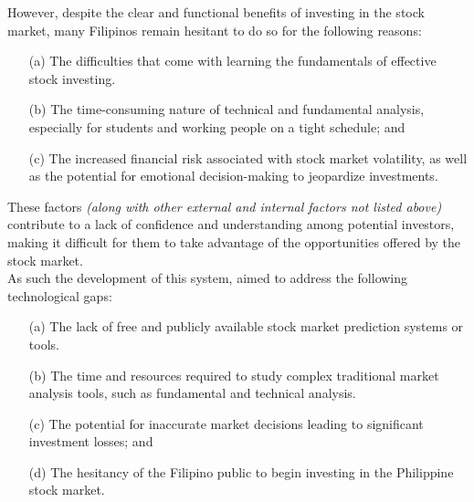 However, despite the clear and functional benefits of investing in the stock market, 
many Filipinos remain hesitant to do so for the following reasons:
\begin{itemize}
  \item[(a)] The difficulties that come with learning the fundamentals 
  of effective stock investing.
  \item[(b)] The time-consuming nature of technical and fundamental analysis, 
  especially for students and working people on a tight schedule; and
  \item[(c)] The increased financial risk associated with stock market volatility, 
  as well as the potential for emotional decision-making to jeopardize investments.
\end{itemize}

These factors \textit{(along with other external and internal factors not listed above)}
contribute to a lack of confidence and understanding among potential investors, 
making it difficult for them to take advantage of the opportunities offered 
by the stock market.
\hfill \\

As such the development of this system, aimed to address the following technological gaps:
\begin{itemize}
  \item[(a)] The lack of free and publicly available 
  stock market prediction systems or tools.
  \item[(b)] The time and resources required to study complex traditional 
  market analysis tools, such as fundamental and technical analysis.
  \item[(c)] The potential for inaccurate market decisions
  leading to significant investment losses; and
  \item[(d)] The hesitancy of the Filipino public to begin 
  investing in the Philippine stock market.
\end{itemize}